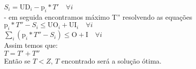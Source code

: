\documentclass{book}
\begin{document}
 		$S_i = \textrm{UD}_i - \textrm{p}_i * T' \quad \forall i$ \\
 
 - em seguida encontramos máximo T'' resolvendo as equações \\
 
$\textrm{p}_i * T'' - S_i \leq \textrm{UO}_i + \textrm{UI}_i \quad \forall i$ \\

$\sum_i{(\textrm{p}_i * T'' - S_i)} \leq \textrm{O} + \textrm{I} \quad \forall i$ \\

Assim temos que: \\

$T = T' + T''$ \\

Então se $T<Z$, $T$ encontrado será a solução ótima.

%
%




\end{document}
